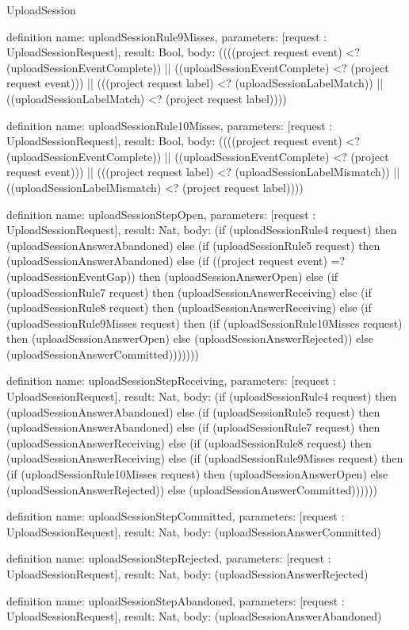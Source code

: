 \begin{lexlean}{UploadSession}
\begin{semanticmodule}
definition{
  name: uploadSessionRule9Misses,
  parameters: [request : UploadSessionRequest],
  result: Bool,
  body: ((((project request event) <? (uploadSessionEventComplete)) || ((uploadSessionEventComplete) <? (project request event))) || (((project request label) <? (uploadSessionLabelMatch)) || ((uploadSessionLabelMatch) <? (project request label))))
}

definition{
  name: uploadSessionRule10Misses,
  parameters: [request : UploadSessionRequest],
  result: Bool,
  body: ((((project request event) <? (uploadSessionEventComplete)) || ((uploadSessionEventComplete) <? (project request event))) || (((project request label) <? (uploadSessionLabelMismatch)) || ((uploadSessionLabelMismatch) <? (project request label))))
}

definition{
  name: uploadSessionStepOpen,
  parameters: [request : UploadSessionRequest],
  result: Nat,
  body: (if (uploadSessionRule4 request) then (uploadSessionAnswerAbandoned) else (if (uploadSessionRule5 request) then (uploadSessionAnswerAbandoned) else (if ((project request event) =? (uploadSessionEventGap)) then (uploadSessionAnswerOpen) else (if (uploadSessionRule7 request) then (uploadSessionAnswerReceiving) else (if (uploadSessionRule8 request) then (uploadSessionAnswerReceiving) else (if (uploadSessionRule9Misses request) then (if (uploadSessionRule10Misses request) then (uploadSessionAnswerOpen) else (uploadSessionAnswerRejected)) else (uploadSessionAnswerCommitted)))))))
}

definition{
  name: uploadSessionStepReceiving,
  parameters: [request : UploadSessionRequest],
  result: Nat,
  body: (if (uploadSessionRule4 request) then (uploadSessionAnswerAbandoned) else (if (uploadSessionRule5 request) then (uploadSessionAnswerAbandoned) else (if (uploadSessionRule7 request) then (uploadSessionAnswerReceiving) else (if (uploadSessionRule8 request) then (uploadSessionAnswerReceiving) else (if (uploadSessionRule9Misses request) then (if (uploadSessionRule10Misses request) then (uploadSessionAnswerOpen) else (uploadSessionAnswerRejected)) else (uploadSessionAnswerCommitted))))))
}

definition{
  name: uploadSessionStepCommitted,
  parameters: [request : UploadSessionRequest],
  result: Nat,
  body: (uploadSessionAnswerCommitted)
}

definition{
  name: uploadSessionStepRejected,
  parameters: [request : UploadSessionRequest],
  result: Nat,
  body: (uploadSessionAnswerRejected)
}

definition{
  name: uploadSessionStepAbandoned,
  parameters: [request : UploadSessionRequest],
  result: Nat,
  body: (uploadSessionAnswerAbandoned)
}


\end{semanticmodule}
\end{lexlean}
